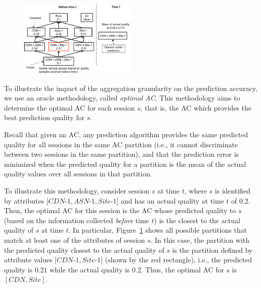 \begin{figure}[h!]
\centering
 \includegraphics[width=0.5\textwidth] {figures/fig-optimal-AC.pdf}
\label{fig:example-optimal-ac}
\end{figure}

 To illustrate the impact of the aggregation
granularity on the prediction accuracy, we use an oracle methodology,
called {\it optimal AC}. This methodology aims to determine the
optimal AC for each session $s$, that is, the AC which provides the
best prediction quality for $s$.

Recall that given an AC, any prediction algorithm provides the same
predicted quality for all sessions in the same AC partition (i.e., it
cannot discriminate between two sessions in the same partition), and
that the prediction error is minimized when the predicted quality for
a partition is the mean of the actual quality values over all sessions
in that partition.

To illustrate this methodology, consider session $s$ at time $t$, where
$s$ is identified by attributes $[CDN$-$1, ASN$-$1, Site$-$1]$ and has
an actual quality at time $t$ of $0.2$. Then, the optimal AC for this
session is the AC whose predicted quality to $s$ (based on the
information collected \emph{before} time $t$) is the closest to the
actual quality of $s$ at time $t$.  In particular,
Figure~\ref{fig:example-optimal-ac} shows all possible partitions that
match at least one of the attributes of session $s$. In this case, the
partition with the predicted quality closest to the actual quality of
$s$ is the partition defined by attribute values $[CDN$-$1, Site$-$1]$
(shown by the red rectangle), i.e., the predicted quality is $0.21$
while the actual quality is $0.2$. Thus, the optimal AC for $s$ is
$[CDN, Site]$.

